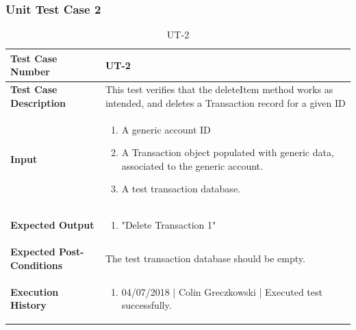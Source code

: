 \documentclass[12pt]{article}
\begin{document}
\subsubsection{Unit Test Case 2}
\def\arraystretch{1.5}%
\begin{table}[htbp]
\centering
\caption {UT-2}
\label{UT-2}
\begin{tabularx}{\textwidth}{ | l | X |}
\hline
\textbf{Test Case Number}      &  UT-2                         \\ \hline
\textbf{Test Case Description}    &  This test verifies that the deleteItem method works as intended, and deletes a Transaction record for a given ID                \\ \hline
\textbf{Input}         & 	\begin{enumerate}
          \item A generic account ID
	\item A Transaction object populated with generic data, associated to the generic account.
	\item A test transaction database.
\end{enumerate} \\ \hline

\textbf{Expected Output}     & \begin{enumerate}
	\item "Delete Transaction 1"
\end{enumerate} \\ \hline
\textbf{Expected Post-Conditions}           & The test transaction database should be empty.                \\ \hline
\textbf{Execution History}   &  \begin{enumerate}
	\item 04/07/2018 | Colin Greczkowski | Executed test successfully.
\end {enumerate} \\ \hline
\end{tabularx}
\end{table}
\clearpage

\end{document}

